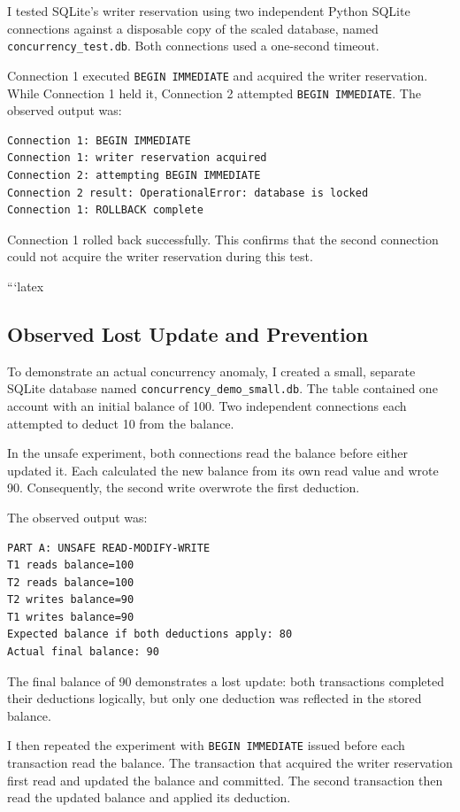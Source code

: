 \documentclass[11pt,a4paper]{article}
\begin{document}
I tested SQLite's writer reservation using two independent Python
SQLite connections against a disposable copy of the scaled database,
named \texttt{concurrency\_test.db}. Both connections used a
one-second timeout.

Connection 1 executed \texttt{BEGIN IMMEDIATE} and acquired the
writer reservation. While Connection 1 held it, Connection 2
attempted \texttt{BEGIN IMMEDIATE}. The observed output was:

\begin{lstlisting}[style=textstyle]
Connection 1: BEGIN IMMEDIATE
Connection 1: writer reservation acquired
Connection 2: attempting BEGIN IMMEDIATE
Connection 2 result: OperationalError: database is locked
Connection 1: ROLLBACK complete
\end{lstlisting}

Connection 1 rolled back successfully. This confirms that the
second connection could not acquire the writer reservation during
this test. 

```latex
\subsection{Observed Lost Update and Prevention}

To demonstrate an actual concurrency anomaly, I created a small,
separate SQLite database named \texttt{concurrency\_demo\_small.db}.
The table contained one account with an initial balance of 100.
Two independent connections each attempted to deduct 10 from the
balance.

In the unsafe experiment, both connections read the balance before
either updated it. Each calculated the new balance from its own
read value and wrote 90. Consequently, the second write overwrote
the first deduction.

The observed output was:

\begin{lstlisting}[style=textstyle]
PART A: UNSAFE READ-MODIFY-WRITE
T1 reads balance=100
T2 reads balance=100
T2 writes balance=90
T1 writes balance=90
Expected balance if both deductions apply: 80
Actual final balance: 90
\end{lstlisting}

The final balance of 90 demonstrates a lost update: both
transactions completed their deductions logically, but only one
deduction was reflected in the stored balance.

I then repeated the experiment with \texttt{BEGIN IMMEDIATE}
issued before each transaction read the balance. The transaction
that acquired the writer reservation first read and updated the
balance and committed. The second transaction then read the
updated balance and applied its deduction.
\end{document}
